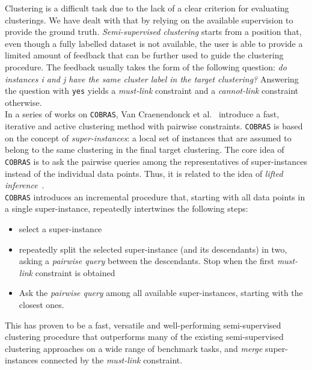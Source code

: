 \begin{tcolorbox}[enhanced,attach boxed title to top center={yshift=-3mm,yshifttext=-1mm}, colback=blue!5!white, colframe=blue!75!black, colbacktitle=white, coltitle=red!25!black,
title=Intermezzo: Semi-supervised clustering with COBRAS,fonttitle=\bfseries, boxed title style={size=small,colframe=blue!75!black} ]

	Clustering is a difficult task due to the lack of a clear criterion for evaluating clusterings.
	We have dealt with that by relying on the available supervision to provide the ground truth.
	\textit{Semi-supervised clustering} starts from a position that, even though a fully labelled dataset is not available, the user is able to provide a limited amount of feedback that can be further used to guide the clustering procedure.
	The feedback usually takes the form of the following question: \textit{do instances i and j have the same cluster label in the target clustering?} Answering the question with \texttt{yes} yields a \textit{must-link} constraint and a \textit{cannot-link} constraint otherwise. \\


	In a series of works on \texttt{COBRAS}, Van Craenendonck et al.~\cite{DBLP:conf/ijcai/CraenendonckDB17,DBLP:journals/corr/abs-1803-11060,DBLP:journals/corr/abs-1805-00779} introduce a fast, iterative and active clustering method with pairwise constraints.
	\texttt{COBRAS} is based on the concept of \textit{super-instances}: a local set of instances that are assumed to belong to the same clustering in the final target clustering.
  The core idea of \texttt{COBRAS} is to ask the pairwise queries among the representatives of super-instances instead of the individual data points.
	Thus, it is related to the idea of \textit{lifted inference}~\cite{Poole:2003:FPI:1630659.1630801}. \\


	\texttt{COBRAS} introduces an incremental procedure that, starting with all data points in a single super-instance, repeatedly intertwines the following steps:
	\begin{itemize}
		\item select a super-instance
		\item repeatedly split the selected super-instance (and its descendants) in two, asking a \textit{pairwise query} between the descendants. Stop when the first \textit{must-link} constraint is obtained
		\item Ask the \textit{pairwise query} among all available super-instances, starting with the closest ones.
	\end{itemize}
	This has proven to be a fast, versatile and well-performing semi-supervised clustering procedure that outperforms many of the existing semi-supervised clustering approaches on a wide range of benchmark tasks, and \textit{merge} super-instances connected by the \textit{must-link} constraint.


\end{tcolorbox}














\cleardoublepage


